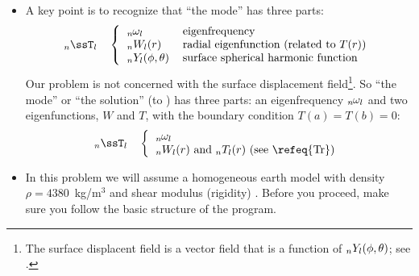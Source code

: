 \documentclass[11pt,titlepage,fleqn]{article}
\begin{document}
\begin{itemize}
\item A key point is to recognize that ``the mode''  has three parts:
%
\begin{equation}
\tnl{n}{l} \hspace{10pt} \left\{
\begin{tabular}{ll}
$\omnl$ & eigenfrequency \\
$\Wnl(r)$ & radial eigenfunction (related to $T(r)$) \\
$\Ynl(\phi,\theta)$ & surface spherical harmonic function
\end{tabular} \right.
\end{equation}
%
Our problem is not concerned with the surface displacement field\footnote{The surface displacent field is a vector field that is a function of $\mbox{${}_nY_l$}(\phi,\theta)$; see \citet[][Section 8.6.1]{DT}.}.
So ``the mode'' or ``the solution''  (to ) has three parts: an eigenfrequency $\mbox{${}_{n\hspace{-0.2 mm}}\omega_l$}$ and two eigenfunctions, $W$ and $T$, with the boundary condition $T(a) = T(b) = 0$:
%
\begin{equation}
\tnl{n}{l} \hspace{10pt} \left\{
\begin{tabular}{ll}
$\omnl$  \\
$\Wnl(r)$ and $\Tnl(r)$ (see \refeq{Tr})
\end{tabular} \right.
\end{equation}
%

\item In this problem we will assume a homogeneous earth model with density $\rho = 4380$~kg/m$^3$ and shear modulus (rigidity) . Before you proceed, make sure you follow the basic structure of the program.
\end{itemize}
\end{document}
